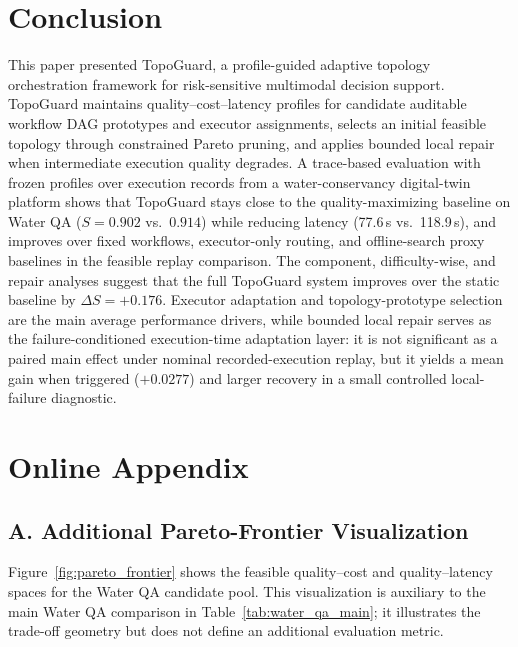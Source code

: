 \documentclass[acmsmall,review,anonymous]{acmart}
\begin{document}
\section{Conclusion}
\label{sec:conclusion}

This paper presented TopoGuard, a profile-guided adaptive topology orchestration framework for risk-sensitive multimodal decision support. TopoGuard maintains quality--cost--latency profiles for candidate auditable workflow DAG prototypes and executor assignments, selects an initial feasible topology through constrained Pareto pruning, and applies bounded local repair when intermediate execution quality degrades. A trace-based evaluation with frozen profiles over execution records from a water-conservancy digital-twin platform shows that TopoGuard stays close to the quality-maximizing baseline on Water QA ($S=0.902$ vs.\ $0.914$) while reducing latency (77.6\,s vs.\ 118.9\,s), and improves over fixed workflows, executor-only routing, and offline-search proxy baselines in the feasible replay comparison. The component, difficulty-wise, and repair analyses suggest that the full TopoGuard system improves over the static baseline by $\Delta S=+0.176$. Executor adaptation and topology-prototype selection are the main average performance drivers, while bounded local repair serves as the failure-conditioned execution-time adaptation layer: it is not significant as a paired main effect under nominal recorded-execution replay, but it yields a mean gain when triggered ($+0.0277$) and larger recovery in a small controlled local-failure diagnostic.


\clearpage
\newpage



\clearpage
\appendix
\section*{Online Appendix}
\label{sec:online_appendix}

\subsection*{A. Additional Pareto-Frontier Visualization}

Figure~\ref{fig:pareto_frontier} shows the feasible quality--cost and quality--latency spaces for the Water QA candidate pool. This visualization is auxiliary to the main Water QA comparison in Table~\ref{tab:water_qa_main}; it illustrates the trade-off geometry but does not define an additional evaluation metric.
\end{document}
